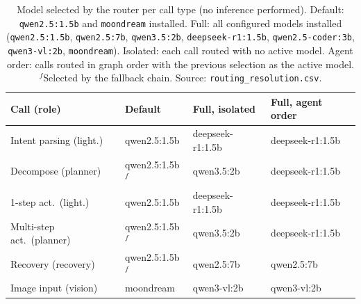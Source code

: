 \begin{table}[t]
\centering
\caption{Model selected by the router per call type (no inference performed). Default: \texttt{qwen2.5:1.5b} and \texttt{moondream} installed. Full: all configured models installed (\texttt{qwen2.5:1.5b}, \texttt{qwen2.5:7b}, \texttt{qwen3.5:2b}, \texttt{deepseek-r1:1.5b}, \texttt{qwen2.5-coder:3b}, \texttt{qwen3-vl:2b}, \texttt{moondream}). Isolated: each call routed with no active model. Agent order: calls routed in graph order with the previous selection as the active model. $^{f}$Selected by the fallback chain. Source: \texttt{routing\_resolution.csv}.}
\label{tab:route}
\footnotesize
\setlength{\tabcolsep}{1.5pt}
\begin{tabular}{@{}llll@{}}
\toprule
Call (role) & Default & Full, isolated & Full, agent order \\
\midrule
Intent parsing (light.) & qwen2.5:1.5b & deepseek-r1:1.5b & deepseek-r1:1.5b \\
Decompose (planner) & qwen2.5:1.5b$^{f}$ & qwen3.5:2b & deepseek-r1:1.5b \\
1-step act.\ (light.) & qwen2.5:1.5b & deepseek-r1:1.5b & deepseek-r1:1.5b \\
Multi-step act.\ (planner) & qwen2.5:1.5b$^{f}$ & qwen3.5:2b & deepseek-r1:1.5b \\
Recovery (recovery) & qwen2.5:1.5b$^{f}$ & qwen2.5:7b & qwen2.5:7b \\
Image input (vision) & moondream & qwen3-vl:2b & qwen3-vl:2b \\
\bottomrule
\end{tabular}
\end{table}
